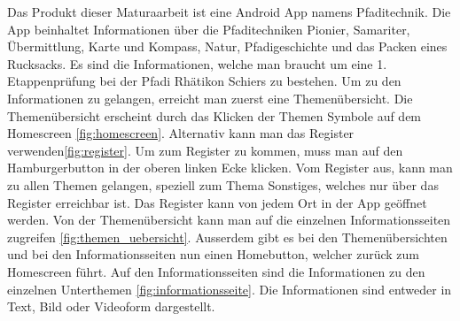 Das Produkt dieser Maturaarbeit ist eine Android App namens Pfaditechnik. Die App beinhaltet Informationen über die Pfaditechniken Pionier, Samariter, Übermittlung, Karte und Kompass, Natur, Pfadigeschichte und das Packen eines Rucksacks. Es sind die Informationen, welche man braucht um eine 1. Etappenprüfung bei der Pfadi Rhätikon Schiers zu bestehen. Um zu den Informationen zu gelangen, erreicht man zuerst eine Themenübersicht. Die Themenübersicht erscheint durch das Klicken der Themen Symbole auf dem Homescreen \cref{fig:homescreen}. Alternativ kann man das Register verwenden\cref{fig:register}. Um zum Register zu kommen, muss man auf den Hamburgerbutton in der oberen linken Ecke klicken. Vom Register aus, kann man zu allen Themen gelangen, speziell zum Thema Sonstiges, welches nur über das Register erreichbar ist. Das Register kann von jedem Ort in der App geöffnet werden. Von der Themenübersicht kann man auf die einzelnen Informationsseiten zugreifen \cref{fig:themen_uebersicht}. Ausserdem gibt es bei den Themenübersichten und bei den Informationsseiten nun einen Homebutton, welcher zurück zum Homescreen führt. Auf den Informationsseiten sind die Informationen zu den einzelnen Unterthemen \cref{fig:informationsseite}. Die Informationen sind entweder in Text, Bild oder Videoform dargestellt. 
